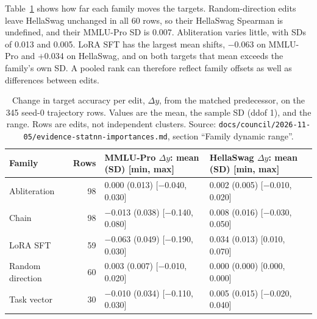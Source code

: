 Table~\ref{tab:dynrange} shows how far each family moves the targets. Random-direction edits leave HellaSwag unchanged in all 60 rows, so their HellaSwag Spearman is undefined, and their MMLU-Pro SD is 0.007. Abliteration varies little, with SDs of 0.013 and 0.005. LoRA SFT has the largest mean shifts, $-$0.063 on MMLU-Pro and $+$0.034 on HellaSwag, and on both targets that mean exceeds the family's own SD. A pooled rank can therefore reflect family offsets as well as differences between edits.
\begin{table}[t]
\centering
\footnotesize
\begin{tabular}{lrll}\toprule
Family & Rows & MMLU-Pro $\Delta y$: mean (SD) [min, max] & HellaSwag $\Delta y$: mean (SD) [min, max] \\\midrule
Abliteration & 98 & 0.000 (0.013) [$-$0.040, 0.030] & 0.002 (0.005) [$-$0.010, 0.020] \\
Chain & 98 & $-$0.013 (0.038) [$-$0.140, 0.080] & 0.008 (0.016) [$-$0.030, 0.050] \\
LoRA SFT & 59 & $-$0.063 (0.049) [$-$0.190, 0.030] & 0.034 (0.013) [0.010, 0.070] \\
Random direction & 60 & 0.003 (0.007) [$-$0.010, 0.020] & 0.000 (0.000) [0.000, 0.000] \\
Task vector & 30 & $-$0.010 (0.034) [$-$0.110, 0.030] & 0.005 (0.015) [$-$0.020, 0.040] \\\bottomrule
\end{tabular}
\caption{Change in target accuracy per edit, $\Delta y$, from the matched predecessor, on the 345 seed-0 trajectory rows. Values are the mean, the sample SD (ddof 1), and the range. Rows are edits, not independent clusters. Source: \texttt{docs/council/2026-11-05/evidence-statnn-importances.md}, section ``Family dynamic range''.}
\label{tab:dynrange}
\end{table}

